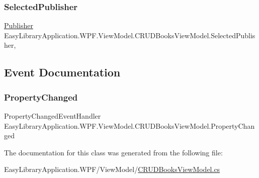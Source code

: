\subsubsection{\texorpdfstring{Selected\+Publisher}{SelectedPublisher}}
{\footnotesize\ttfamily \mbox{\hyperlink{class_easy_library_application_1_1_w_p_f_1_1_model_1_1_publisher}{Publisher}} Easy\+Library\+Application.\+W\+P\+F.\+View\+Model.\+C\+R\+U\+D\+Books\+View\+Model.\+Selected\+Publisher\hspace{0.3cm}{\ttfamily [get]}, {\ttfamily [set]}}



\subsection{Event Documentation}
\mbox{\label{class_easy_library_application_1_1_w_p_f_1_1_view_model_1_1_c_r_u_d_books_view_model_afc7da22698f433d6194c4a8d48021301}} 
\subsubsection{\texorpdfstring{Property\+Changed}{PropertyChanged}}
{\footnotesize\ttfamily Property\+Changed\+Event\+Handler Easy\+Library\+Application.\+W\+P\+F.\+View\+Model.\+C\+R\+U\+D\+Books\+View\+Model.\+Property\+Changed}



The documentation for this class was generated from the following file\+:\begin{DoxyCompactItemize}
\item 
Easy\+Library\+Application.\+W\+P\+F/\+View\+Model/\mbox{\hyperlink{_c_r_u_d_books_view_model_8cs}{C\+R\+U\+D\+Books\+View\+Model.\+cs}}\end{DoxyCompactItemize}
